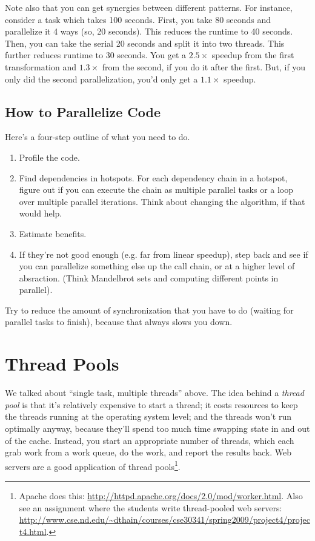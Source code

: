 \documentclass[a4paper]{report}
\begin{document}
Note also that you can get synergies between different patterns.
For instance, consider a task which takes 100 seconds. First, you
take 80 seconds and parallelize it 4 ways (so, 20 seconds). This
reduces the runtime to 40 seconds. Then, you can take the serial 
20 seconds and split it into two threads. This further reduces 
runtime to 30 seconds. You get a $2.5\times$ speedup from the
first transformation and $1.3\times$ from the second, if you do it
after the first. But, if you only did the second parallelization,
you'd only get a $1.1\times$ speedup.

\subsection*{How to Parallelize Code}
Here's a four-step outline of what you need to do.
\begin{enumerate}
\item Profile the code.
\item Find dependencies in hotspots. For each dependency chain in
a hotspot, figure out if you can execute the chain as
multiple parallel tasks or a loop over multiple parallel iterations.
Think about changing the algorithm, if that would help.
\item Estimate benefits. 
\item If they're not good enough (e.g. far from linear speedup),
step back and see if you can parallelize something else up the
call chain, or at a higher level of absraction.
(Think Mandelbrot sets and computing different points in parallel).
\end{enumerate}
Try to reduce the amount of synchronization that you have to do
(waiting for parallel tasks to finish), because that always slows
you down.

\section*{Thread Pools} We talked about ``single task, multiple threads''
above. The idea behind a \emph{thread pool} is that it's relatively
expensive to start a thread; it costs resources to keep the threads
running at the operating system level; and the threads won't run
optimally anyway, because they'll spend too much time swapping state
in and out of the cache.  Instead, you start an appropriate number of
threads, which each grab work from a work queue, do the work,
and report the results back. Web servers are a good application of
thread pools\footnote{Apache does this: \url{http://httpd.apache.org/docs/2.0/mod/worker.html}. Also see an assignment where the students write thread-pooled web servers: \url{http://www.cse.nd.edu/~dthain/courses/cse30341/spring2009/project4/project4.html}.}.
\end{document}
